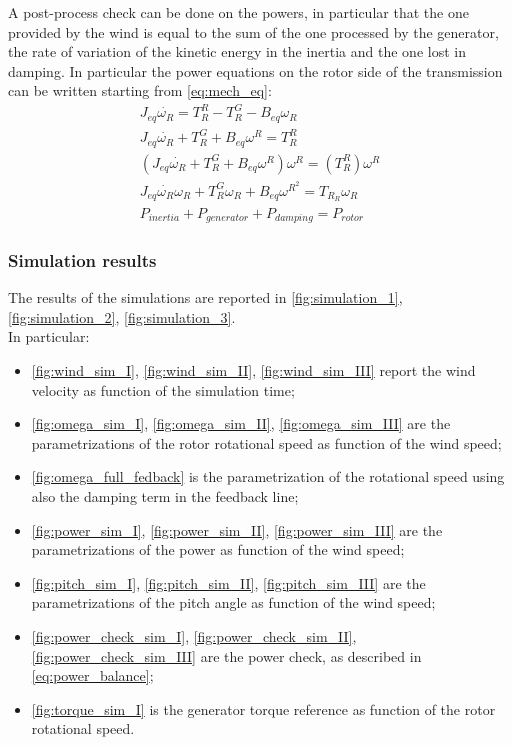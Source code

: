 A post-process check can be done on the powers, in particular that the one provided by the wind is equal to the sum of the one processed by the generator, the rate of variation of the kinetic energy in the inertia and the one lost in damping. In particular the power equations on the rotor side of the transmission can be written starting from \autoref{eq:mech_eq}:
\begin{gather}
    J_{eq}\dot{\omega_{R}} = T_R^R - T_R^G-B_{eq}\omega_R\\
    J_{eq}\dot{\omega_{R}} + T_R^G + B_{eq}\omega^R = T_R^R\\
    \left(J_{eq}\dot{\omega_{R}} + T_R^G + B_{eq}\omega^R\right)\omega^R = \left(T_R^R\right)\omega^R\\
    J_{eq}\dot{\omega_{R}}\omega_{R} + T_R^{G}\omega_{R} + B_{eq}\omega^{R^{2}} = T_R_{R}\omega_{R}\\
    P_{inertia} + P_{generator} + P_{damping} = P_{rotor} 
    \label{eq:power_balance}
\end{gather}

\subsubsection{Simulation results}
The results of the simulations are reported in \autoref{fig:simulation_1}, \ref{fig:simulation_2}, \ref{fig:simulation_3}. \\
In particular:
\begin{itemize}
  \item \autoref{fig:wind_sim_I}, \ref{fig:wind_sim_II}, \ref{fig:wind_sim_III} report the wind velocity as function of the simulation time;
  \item \autoref{fig:omega_sim_I}, \ref{fig:omega_sim_II}, \ref{fig:omega_sim_III} are the parametrizations of the rotor rotational speed as function of the wind speed;
  \item \autoref{fig:omega_full_fedback} is the parametrization of the rotational speed using also the damping term in the feedback line; 
  \item \autoref{fig:power_sim_I}, \ref{fig:power_sim_II}, \ref{fig:power_sim_III} are the parametrizations of the power as function of the wind speed;
  \item \autoref{fig:pitch_sim_I}, \ref{fig:pitch_sim_II}, \ref{fig:pitch_sim_III} are the parametrizations of the pitch angle as function of the wind speed;
  \item \autoref{fig:power_check_sim_I}, \ref{fig:power_check_sim_II}, \ref{fig:power_check_sim_III} are the power check, as described in \autoref{eq:power_balance};
  \item \autoref{fig:torque_sim_I} is the generator torque reference as function of the rotor rotational speed.
\end{itemize}

